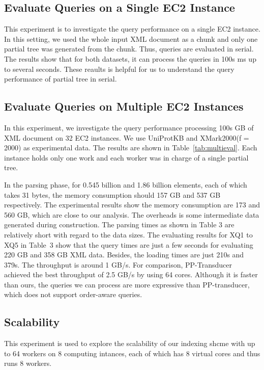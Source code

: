 \subsection{Evaluate Queries on a Single EC2 Instance}

This experiment is to investigate the query performance on a single EC2
instance. In this setting, we used the whole input XML document as a chunk and
only one partial tree was generated from the chunk. Thus, queries are evaluated
in serial. The results show that for both datasets, it can process the queries
in 100s ms up to several seconds. These reaults is helpful for us to understand
the query performance of partial tree in serial.


\subsection{Evaluate Queries on Multiple EC2 Instances}

In this experiment, we investigate the query performance processing 100s GB of
XML document on 32 EC2 instances. We use UniProtKB and XMark2000(f = 2000) as
experimental data. The results are shown in Table~\ref{tab:multieval}. Each
instance holds only one work and each worker was in charge of a single partial
tree.

In the parsing phase, for 0.545 billion and 1.86 billion elements, each of which
takes 31 bytes, the memory consumption should 157 GB and 537 GB respectively.
The experimental results show the memory consumption are 173 and 560 GB, which
are close to our analysis.  The overheads is some intermediate data generated
during construction. The parsing times as shown in Table 3 are relatively short
with regard to the data sizes. The evaluating results for XQ1 to XQ5 in Table~3
show that  the query times are just a few seconds for evaluating 220 GB and 358
GB XML data.  Besides, the loading times are just 210s and 379s.  The throughput
is around 1 GB/s. For comparison, PP-Transducer~\cite{OgTP13} achieved the best
throughput of 2.5 GB/s by using 64 cores. Although it is faster than ours, the
queries we can process are more expressive than PP-transducer, which does not
support order-aware queries.

\subsection{Scalability}

This experiment is used to explore the scalability of our indexing shcme with up
to 64 workers on 8 computing intances, each of which has 8 virtual cores and
thus runs 8 workers.

